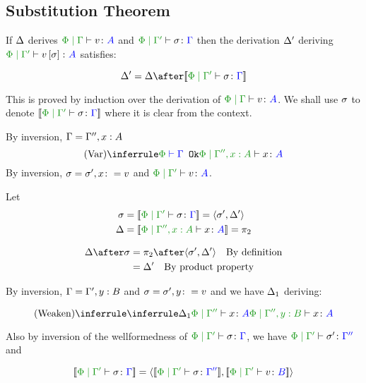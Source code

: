 \documentclass{report}
\begin{document}
\subsection{Substitution Theorem}
If $\Delta$ derives $\gpetyperelation{v}{A}$ and $\etyperelation{\P}{\G'}{\si}{\G}$ then the derivation $\Delta'$ deriving $\etyperelation{\P}{\G'}{v\ssi}{A}$ satisfies:

\begin{equation}
    \D' = \D \after\deno{\etyperelation{\P}{\G'}{\si}{\G}}
\end{equation}

This is proved by induction over the derivation of $\etyperelation{\P}{\G}{v}{A}$.
We shall use $\sigma$ to denote $\deno{\etyperelation{\P}{\G'}{\si}{\G}}$ where it is clear from the context.

By inversion, $\Gamma = \Gamma'', x:A$
\begin{equation}
    \ntreeruleI{Var}{\wellformedok{\P}{\G}}{\etyperelation{\P}{\G'', x:A}{x}{A}}
\end{equation}
By inversion, $\sigma = \sigma', x\colon= v$ and $\etyperelation{\P}{\G'}{v}{A}$.

Let 
\begin{align*}
    \si &=\deno{\etyperelation{\P}{\G'}{\si}{\G}} = \pr{\si'}{\D'}\\
    \D &=\deno{\etyperelation{\P}{\G'', x:A}{x}{A}} = \pp\\
\end{align*}

\begin{align*}
    \D\after\si &= \pp\after\pr{\si'}{\D'}\qt{By definition}\\
    &= \D'\qt{By product property}
\end{align*}


By inversion, $\Gamma = \Gamma', y:B$ and $\sigma = \sigma', y\colon= v$
and we have $\Delta_1$ deriving:

\begin{equation}
    \ntreeruleI{Weaken}{\treeruleI{\D_1}{\etyperelation{\P}{\G''}{x}{A}}}{\etyperelation{\P}{\G'',y: B}{x}{A}}
\end{equation}

Also by inversion of the wellformedness of $\etyperelation{\P}{\G'}{\si}{\G}$, we have $\etyperelation{\P}{\G'}{\si'}{\G''}$ and 

\begin{equation}
    \deno{\etyperelation{\P}{\G'}{\si}{\G}} = \pr{\deno{\etyperelation{\P}{\G'}{\si}{\G''}}}{\deno{\etyperelation{\P}{\G'}{v}{B}}}
\end{equation}
\end{document}
